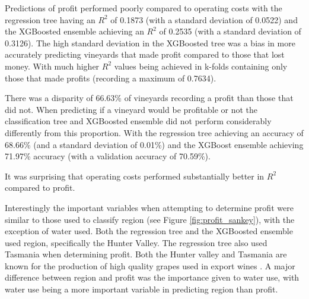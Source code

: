 \documentclass[review,12pt,authoryear]{elsarticle}
\begin{document}
\begin{linenumbers}
Predictions of profit performed poorly compared to operating costs with the regression tree having an $R^2$ of 0.1873 (with a standard deviation of 0.0522) and the XGBoosted ensemble achieving an $R^2$ of 0.2535 (with a standard deviation of 0.3126). The high standard deviation in the XGBoosted tree was a bias in more accurately predicting vineyards that made profit compared to those that lost money.
With much higher $R^2$ values being achieved in k-folds containing only those that made profits (recording a maximum of 0.7634).
\par
There was a disparity of 66.63\% of vineyards recording a profit than those that did not. When predicting if a vineyard would be profitable or not the classification tree and XGBoosted ensemble did not perform considerably differently from this proportion. With the regression tree achieving an accuracy of 68.66\% (and a standard deviation of 0.01\%) and the XGBoost ensemble achieving 71.97\% accuracy (with a validation accuracy of 70.59\%).
\par
It was surprising that operating costs performed substantially better in $R^2$ compared to profit. %

Interestingly the important variables when attempting to determine profit were similar to those used to classify region (see Figure \ref{fig:profit_sankey}), with the exception of water used. Both the regression tree and the XGBoosted ensemble used region, specifically the Hunter Valley. The regression tree also used Tasmania when determining profit. Both the Hunter valley and Tasmania are known for the production of high quality grapes used in export wines \citep{wineaustraliaNationalVintageReport2022}. A major difference between region and profit was the importance given to water use, with water use being a more important variable in predicting region than profit. 


\end{linenumbers}
\end{document}
